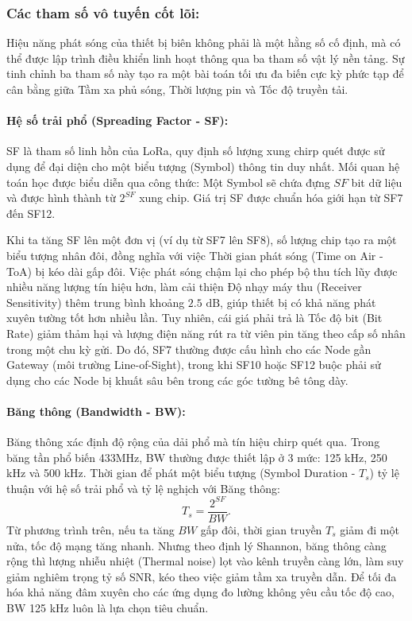 \subsubsection{Các tham số vô tuyến cốt lõi:}
Hiệu năng phát sóng của thiết bị biên không phải là một hằng số cố định, mà có thể được lập trình điều khiển linh hoạt thông qua ba tham số vật lý nền tảng. Sự tinh chỉnh ba tham số này tạo ra một bài toán tối ưu đa biến cực kỳ phức tạp để cân bằng giữa Tầm xa phủ sóng, Thời lượng pin và Tốc độ truyền tải.
\paragraph{Hệ số trải phổ (Spreading Factor - SF):}
SF là tham số linh hồn của LoRa, quy định số lượng xung chirp quét được sử dụng để đại diện cho một biểu tượng (Symbol) thông tin duy nhất. Mối quan hệ toán học được biểu diễn qua công thức: Một Symbol sẽ chứa đựng $SF$ bit dữ liệu và được hình thành từ $2^{SF}$ xung chip. Giá trị SF được chuẩn hóa giới hạn từ SF7 đến SF12.

Khi ta tăng SF lên một đơn vị (ví dụ từ SF7 lên SF8), số lượng chip tạo ra một biểu tượng nhân đôi, đồng nghĩa với việc Thời gian phát sóng (Time on Air - ToA) bị kéo dài gấp đôi. Việc phát sóng chậm lại cho phép bộ thu tích lũy được nhiều năng lượng tín hiệu hơn, làm cải thiện Độ nhạy máy thu (Receiver Sensitivity) thêm trung bình khoảng $2.5 \text{ dB}$, giúp thiết bị có khả năng phát xuyên tường tốt hơn nhiều lần. Tuy nhiên, cái giá phải trả là Tốc độ bit (Bit Rate) giảm thảm hại và lượng điện năng rút ra từ viên pin tăng theo cấp số nhân trong một chu kỳ gửi. Do đó, SF7 thường được cấu hình cho các Node gần Gateway (môi trường Line-of-Sight), trong khi SF10 hoặc SF12 buộc phải sử dụng cho các Node bị khuất sâu bên trong các góc tường bê tông dày.
\paragraph{Băng thông (Bandwidth - BW):}
Băng thông xác định độ rộng của dải phổ mà tín hiệu chirp quét qua. Trong băng tần phổ biến 433MHz, BW thường được thiết lập ở 3 mức: 125 kHz, 250 kHz và 500 kHz. Thời gian để phát một biểu tượng (Symbol Duration - $T_s$) tỷ lệ thuận với hệ số trải phổ và tỷ lệ nghịch với Băng thông\cite{adelantado2017understanding}:
\begin{equation}
    {T_s = \frac{2^{SF}}{BW}}.
\end{equation}
Từ phương trình trên, nếu ta tăng $BW$ gấp đôi, thời gian truyền $T_s$ giảm đi một nửa, tốc độ mạng tăng nhanh. Nhưng theo định lý Shannon, băng thông càng rộng thì lượng nhiễu nhiệt (Thermal noise) lọt vào kênh truyền càng lớn, làm suy giảm nghiêm trọng tỷ số SNR, kéo theo việc giảm tầm xa truyền dẫn. Để tối đa hóa khả năng đâm xuyên cho các ứng dụng đo lường không yêu cầu tốc độ cao, BW 125 kHz luôn là lựa chọn tiêu chuẩn.
